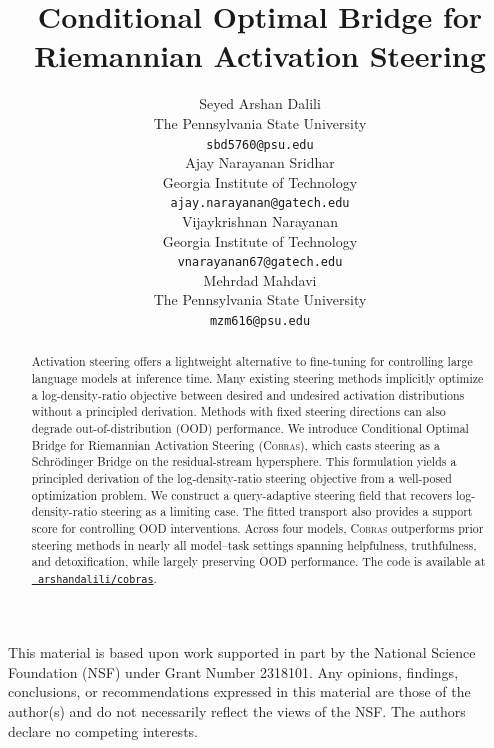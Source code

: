 \documentclass{article}
\title{Conditional Optimal Bridge for Riemannian Activation Steering}
\author{%
  Seyed Arshan Dalili \\
  The Pennsylvania State University \\
  \texttt{sbd5760@psu.edu} \\
  \And
  Ajay Narayanan Sridhar \\
  Georgia Institute of Technology \\
  \texttt{ajay.narayanan@gatech.edu} \\
  \AND
  Vijaykrishnan Narayanan \\
  Georgia Institute of Technology \\
  \texttt{vnarayanan67@gatech.edu} \\
  \And
  Mehrdad Mahdavi \\
  The Pennsylvania State University \\
  \texttt{mzm616@psu.edu} \\
}
\theoremstyle{plain}
\begin{document}
\maketitle


\begin{abstract}
Activation steering offers a lightweight alternative to fine-tuning for controlling large language models at inference time. Many existing steering methods implicitly optimize a log-density-ratio objective between desired and undesired activation distributions without a principled derivation. Methods with fixed steering directions can also degrade out-of-distribution (OOD) performance. We introduce Conditional Optimal Bridge for Riemannian Activation Steering (\textsc{Cobras}), which casts steering as a Schr\"{o}dinger Bridge on the residual-stream hypersphere. This formulation yields a principled derivation of the log-density-ratio steering objective from a well-posed optimization problem. We construct a query-adaptive steering field that recovers log-density-ratio steering as a limiting case. The fitted transport also provides a support score for controlling OOD interventions. Across four models, \textsc{Cobras} outperforms prior steering methods in nearly all model--task settings spanning helpfulness, truthfulness, and detoxification, while largely preserving OOD performance. The code is available at \href{https://github.com/arshandalili/cobras}{\texttt{\faGithub\ arshandalili/cobras}}.
\end{abstract}











\clearpage

\begin{ack}
This material is based upon work supported in part by the National Science Foundation (NSF) under Grant Number 2318101. Any opinions, findings, conclusions, or recommendations expressed in this material are those of the author(s) and do not necessarily reflect the views of the NSF.
The authors declare no competing interests.
\end{ack}




\clearpage
\appendix



\newpage

\end{document}
